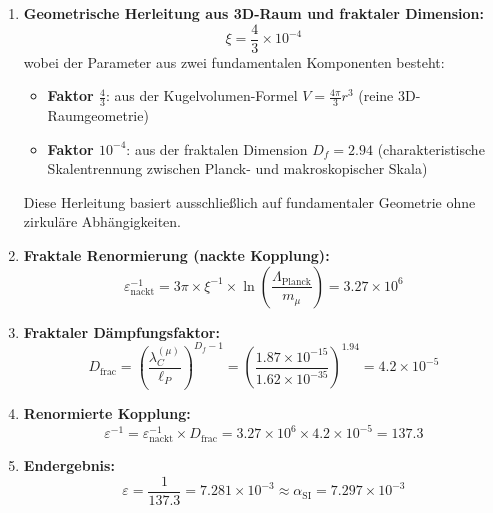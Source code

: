 \documentclass[12pt,a4paper]{article}
\numberwithin{equation}{section}
\newcommand{\xipar}{\xi}
\newcommand{\epsilonT}{\varepsilon}
\newcommand{\alphaSI}{\alpha_{\text{SI}}}
\newcommand{\Df}{D_f}
\newcommand{\lP}{\ell_P}
\newcommand{\lambdaC}{\lambda_C}
\begin{document}
	\begin{enumerate}
		\item \textbf{Geometrische Herleitung aus 3D-Raum und fraktaler Dimension:}
		\begin{equation}
			\xipar = \frac{4}{3} \times 10^{-4}
			\label{eq:xi_step1}
		\end{equation}
		wobei der Parameter aus zwei fundamentalen Komponenten besteht:
		\begin{itemize}
			\item \textbf{Faktor $\frac{4}{3}$}: aus der Kugelvolumen-Formel $V = \frac{4\pi}{3}r^3$ (reine 3D-Raumgeometrie)
			\item \textbf{Faktor $10^{-4}$}: aus der fraktalen Dimension $D_f = 2.94$ (charakteristische Skalentrennung zwischen Planck- und makroskopischer Skala)
		\end{itemize}
		Diese Herleitung basiert ausschließlich auf fundamentaler Geometrie ohne zirkuläre Abhängigkeiten.
		
		\item \textbf{Fraktale Renormierung (nackte Kopplung):}
		\begin{equation}
			\epsilonT^{-1}_{\text{nackt}} = 3\pi \times \xipar^{-1} \times \ln\left(\frac{\Lambda_{\text{Planck}}}{m_\mu}\right) = 3.27 \times 10^6
			\label{eq:epsilon_step2}
		\end{equation}
		
		\item \textbf{Fraktaler Dämpfungsfaktor:}
		\begin{equation}
			D_{\text{frac}} = \left(\frac{\lambdaC^{(\mu)}}{\lP}\right)^{\Df-1} = \left(\frac{1.87 \times 10^{-15}}{1.62 \times 10^{-35}}\right)^{1.94} = 4.2 \times 10^{-5}
			\label{eq:epsilon_step3}
		\end{equation}
		
		\item \textbf{Renormierte Kopplung:}
		\begin{equation}
			\epsilonT^{-1} = \epsilonT^{-1}_{\text{nackt}} \times D_{\text{frac}} = 3.27 \times 10^6 \times 4.2 \times 10^{-5} = 137.3
			\label{eq:epsilon_step4}
		\end{equation}
		
		\item \textbf{Endergebnis:}
		\begin{equation}
			\epsilonT = \frac{1}{137.3} = 7.281 \times 10^{-3} \approx \alphaSI = 7.297 \times 10^{-3}
			\label{eq:epsilon_step5}
		\end{equation}
	\end{enumerate}
	
\end{document}
